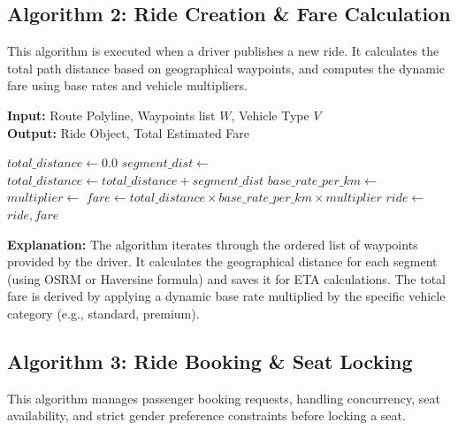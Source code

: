 \subsection{Algorithm 2: Ride Creation \& Fare Calculation}

This algorithm is executed when a driver publishes a new ride. It calculates the total path distance based on geographical waypoints, and computes the dynamic fare using base rates and vehicle multipliers.

\begin{algorithm}[H]
\caption{Ride Creation and Fare Calculation}
\textbf{Input:} Route Polyline, Waypoints list $W$, Vehicle Type $V$ \\
\textbf{Output:} Ride Object, Total Estimated Fare
\begin{algorithmic}[1]
    \State $total\_distance \gets 0.0$
        \State $segment\_dist \gets$ 
        \State $total\_distance \gets total\_distance + segment\_dist$
        \State {}
    \EndFor
    \State $base\_rate\_per\_km \gets$ 
    \State $multiplier \gets$ 
    \State $fare \gets total\_distance \times base\_rate\_per\_km \times multiplier$
    \State $ride \gets$ 
    \State \Return $ride, fare$
\EndFunction
\end{algorithmic}
\end{algorithm}

\textbf{Explanation:} The algorithm iterates through the ordered list of waypoints provided by the driver. It calculates the geographical distance for each segment (using OSRM or Haversine formula) and saves it for ETA calculations. The total fare is derived by applying a dynamic base rate multiplied by the specific vehicle category (e.g., standard, premium).

\subsection{Algorithm 3: Ride Booking \& Seat Locking}

This algorithm manages passenger booking requests, handling concurrency, seat availability, and strict gender preference constraints before locking a seat.


